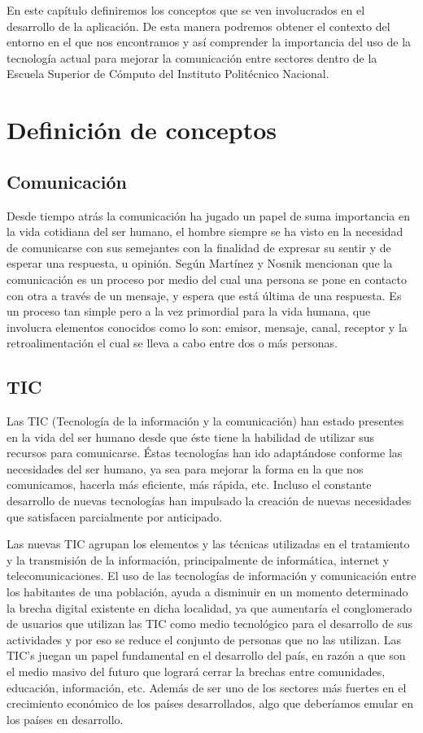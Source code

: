 
En este capítulo definiremos los conceptos que se ven involucrados en el desarrollo de la aplicación. De esta manera podremos obtener el contexto del entorno en el que nos encontramos y así comprender la importancia del uso de la tecnología actual para mejorar la comunicación entre sectores dentro de la Escuela Superior de Cómputo del Instituto Politécnico Nacional.


\section{Definición de conceptos}
	\subsection{Comunicación}
	Desde tiempo atrás la comunicación ha jugado un papel de suma importancia en la vida cotidiana del ser humano, el hombre siempre se ha visto en la necesidad de comunicarse con sus semejantes con la finalidad de expresar su sentir y de esperar una respuesta, u opinión. Según Martínez y Nosnik mencionan que la comunicación es un proceso por medio del cual una persona se pone en contacto con otra a través de un mensaje, y espera que está última de una respuesta. \cite{01} Es un proceso tan simple pero a la vez primordial para la vida humana, que involucra elementos conocidos como lo son: emisor, mensaje, canal, receptor y la retroalimentación el cual se lleva a cabo entre dos o más personas.\\

	\subsection{TIC}
	Las TIC (Tecnología de la información y la comunicación) han estado presentes en la vida del ser humano desde que éste tiene la habilidad de utilizar sus recursos para comunicarse. Éstas tecnologías han ido adaptándose conforme las necesidades del ser humano, ya sea para mejorar la forma en la que nos comunicamos, hacerla más eficiente, más rápida, etc. Incluso el constante desarrollo de nuevas tecnologías han impulsado la creación de nuevas necesidades que satisfacen parcialmente por anticipado.
	 
	Las nuevas TIC agrupan los elementos y las técnicas utilizadas en el tratamiento y la transmisión de la información, principalmente de informática, internet y telecomunicaciones. El uso de las tecnologías de información y comunicación entre los habitantes de una población, ayuda a disminuir en un momento determinado la brecha digital existente en dicha localidad, ya que aumentaría el conglomerado de usuarios que utilizan las TIC como medio tecnológico para el desarrollo de sus actividades y por eso se reduce el conjunto de personas que no las utilizan. Las TIC's juegan un papel fundamental en el desarrollo del país, en razón a que son el medio masivo del futuro que logrará cerrar la brechas entre comunidades, educación, información, etc. Además de ser uno de los sectores más fuertes en el crecimiento económico de los países desarrollados, algo que deberíamos emular en los países en desarrollo. \cite{02}
	
